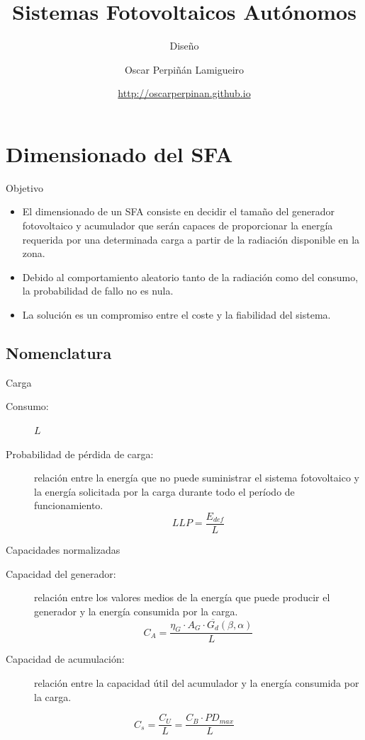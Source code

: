 \documentclass[xcolor={usenames,svgnames,dvipsnames}]{beamer}
\author{Oscar Perpiñán Lamigueiro}
\date{\url{http://oscarperpinan.github.io}}
\title{Sistemas Fotovoltaicos Autónomos}
\subtitle{Diseño}
\begin{document}
\maketitle

\section{Dimensionado del SFA}
\label{sec:org016783f}
\begin{frame}[label={sec:org6a01120}]{Objetivo}
\begin{itemize}
\item El dimensionado de un SFA consiste en \alert{decidir el tamaño del
generador fotovoltaico y acumulador} que serán capaces de
\alert{proporcionar la energía requerida} por una determinada carga a partir
de la \alert{radiación disponible} en la zona.

\item Debido al comportamiento aleatorio tanto de la radiación como del
consumo, la \alert{probabilidad de fallo no es nula}.

\item La solución es un compromiso entre el coste y la fiabilidad del
sistema.
\end{itemize}
\end{frame}


\subsection{Nomenclatura}
\label{sec:org6744e42}
\begin{frame}[label={sec:org717f48e}]{Carga}
\begin{description}
\item[{Consumo:}] \(L\)

\item[{Probabilidad de pérdida de carga:}] relación entre la energía que no
puede suministrar el sistema fotovoltaico y la energía solicitada por
la carga durante todo el período de
funcionamiento.$$LLP=\frac{E_{def}}{L}$$
\end{description}
\end{frame}

\begin{frame}[label={sec:orgb33e172}]{Capacidades normalizadas}
\begin{description}
\item[{Capacidad del generador:}] relación entre los valores medios de la
energía que puede producir el generador y la energía consumida por la
carga.
$$C_{A}=\frac{\eta_{G}\cdot A_{G}\cdot\overline{G_{d}}(\beta,\alpha)}{L}$$

\item[{Capacidad de acumulación:}] relación entre la capacidad útil del acumulador y la energía consumida por la carga.
\end{description}
\[
  C_{s}=\frac{C_{U}}{L}=\frac{C_{B}\cdot PD_{max}}{L}
\]
\end{frame}
\end{document}
